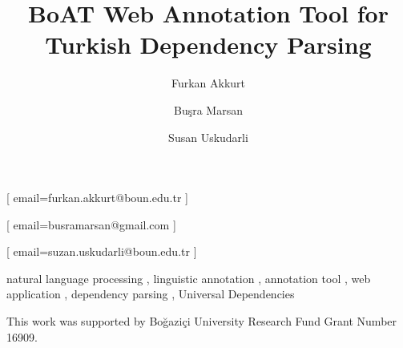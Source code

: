 \documentclass[
]{ceurart}
\begin{document}


\title{BoAT Web Annotation Tool for Turkish Dependency Parsing}

\author[1]{Furkan Akkurt}[%
email=furkan.akkurt@boun.edu.tr
]

\author[2]{Buşra Marsan}[%
email=busramarsan@gmail.com
]

\author[1]{Susan Uskudarli}[%
email=suzan.uskudarli@boun.edu.tr
]

\address[1]{ Department of Computer Engineering, Bogazici University, Istanbul, Turkey }
\address[1]{ Department of Linguistics, Bogazici University, Istanbul, Turkey }



\begin{keywords}
natural language processing \sep
linguistic annotation \sep
annotation tool \sep
web application \sep
dependency parsing \sep
Universal Dependencies
\end{keywords}

\maketitle










\begin{acknowledgments}
This work was supported by Boğaziçi University Research Fund Grant Number 16909.
\end{acknowledgments}


\end{document}
